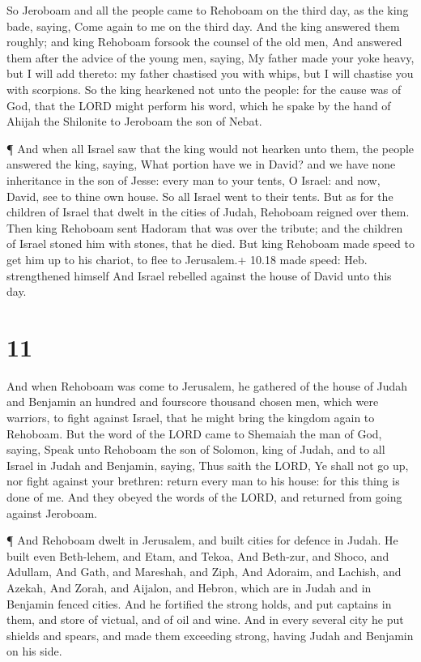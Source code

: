  So Jeroboam and all the people came to Rehoboam on the
third day, as the king bade, saying, Come again to me on the third day.
 And the king answered them roughly; and king Rehoboam
forsook the counsel of the old men,  And answered them
after the advice of the young men, saying, My father made your yoke
heavy, but I will add thereto: my father chastised you with whips, but I
will chastise you with scorpions.  So the king hearkened
not unto the people: for the cause was of God, that the LORD might
perform his word, which he spake by the hand of Ahijah the Shilonite to
Jeroboam the son of Nebat.

 ¶ And when all Israel saw that the king would not hearken
unto them, the people answered the king, saying, What portion have we in
David? and we have none inheritance in the son of Jesse: every man to
your tents, O Israel: and now, David, see to thine own house. So all
Israel went to their tents.  But as for the children of
Israel that dwelt in the cities of Judah, Rehoboam reigned over them.
 Then king Rehoboam sent Hadoram that was over the tribute;
and the children of Israel stoned him with stones, that he died. But
king Rehoboam made speed to get him up to his chariot, to flee to
Jerusalem.+ 10.18 made speed: Heb. strengthened himself 
And Israel rebelled against the house of David unto this day.

\hypertarget{section-10}{%
\section{11}\label{section-10}}

 And when Rehoboam was come to Jerusalem, he gathered of the
house of Judah and Benjamin an hundred and fourscore thousand chosen
men, which were warriors, to fight against Israel, that he might bring
the kingdom again to Rehoboam.  But the word of the LORD
came to Shemaiah the man of God, saying,  Speak unto
Rehoboam the son of Solomon, king of Judah, and to all Israel in Judah
and Benjamin, saying,  Thus saith the LORD, Ye shall not go
up, nor fight against your brethren: return every man to his house: for
this thing is done of me. And they obeyed the words of the LORD, and
returned from going against Jeroboam.

 ¶ And Rehoboam dwelt in Jerusalem, and built cities for
defence in Judah.  He built even Beth-lehem, and Etam, and
Tekoa,  And Beth-zur, and Shoco, and Adullam, 
And Gath, and Mareshah, and Ziph,  And Adoraim, and Lachish,
and Azekah,  And Zorah, and Aijalon, and Hebron, which are
in Judah and in Benjamin fenced cities.  And he fortified
the strong holds, and put captains in them, and store of victual, and of
oil and wine.  And in every several city he put shields and
spears, and made them exceeding strong, having Judah and Benjamin on his
side.

